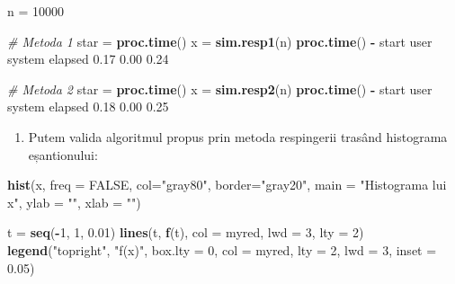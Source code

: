 \documentclass[]{article}
\newenvironment{Shaded}{\begin{snugshade}}{\end{snugshade}}
\newcommand{\KeywordTok}[1]{\textcolor[rgb]{0.13,0.29,0.53}{\textbf{#1}}}
\newcommand{\DataTypeTok}[1]{\textcolor[rgb]{0.13,0.29,0.53}{#1}}
\newcommand{\DecValTok}[1]{\textcolor[rgb]{0.00,0.00,0.81}{#1}}
\newcommand{\FloatTok}[1]{\textcolor[rgb]{0.00,0.00,0.81}{#1}}
\newcommand{\StringTok}[1]{\textcolor[rgb]{0.31,0.60,0.02}{#1}}
\newcommand{\CommentTok}[1]{\textcolor[rgb]{0.56,0.35,0.01}{\textit{#1}}}
\newcommand{\OtherTok}[1]{\textcolor[rgb]{0.56,0.35,0.01}{#1}}
\newcommand{\OperatorTok}[1]{\textcolor[rgb]{0.81,0.36,0.00}{\textbf{#1}}}
\newcommand{\NormalTok}[1]{#1}
\providecommand{\tightlist}{%
  \setlength{\itemsep}{0pt}\setlength{\parskip}{0pt}}
\begin{document}
\begin{Shaded}
\begin{Highlighting}[]
\NormalTok{n =}\StringTok{ }\DecValTok{10000}

\CommentTok{# Metoda 1}
\NormalTok{star =}\StringTok{ }\KeywordTok{proc.time}\NormalTok{()}
\NormalTok{x =}\StringTok{ }\KeywordTok{sim.resp1}\NormalTok{(n)}
\KeywordTok{proc.time}\NormalTok{() }\OperatorTok{-}\StringTok{ }\NormalTok{start}
\NormalTok{   user  system elapsed }
   \FloatTok{0.17}    \FloatTok{0.00}    \FloatTok{0.24} 

\CommentTok{# Metoda 2}
\NormalTok{star =}\StringTok{ }\KeywordTok{proc.time}\NormalTok{()}
\NormalTok{x =}\StringTok{ }\KeywordTok{sim.resp2}\NormalTok{(n)}
\KeywordTok{proc.time}\NormalTok{() }\OperatorTok{-}\StringTok{ }\NormalTok{start}
\NormalTok{   user  system elapsed }
   \FloatTok{0.18}    \FloatTok{0.00}    \FloatTok{0.25} 
\end{Highlighting}
\end{Shaded}

\begin{enumerate}
\def\labelenumi{\arabic{enumi}.}
\setcounter{enumi}{1}
\tightlist
\item
  Putem valida algoritmul propus prin metoda respingerii trasând
  histograma eșantionului:
\end{enumerate}

\begin{Shaded}
\begin{Highlighting}[]
\KeywordTok{hist}\NormalTok{(x, }\DataTypeTok{freq =} \OtherTok{FALSE}\NormalTok{, }
     \DataTypeTok{col=}\StringTok{"gray80"}\NormalTok{, }
     \DataTypeTok{border=}\StringTok{"gray20"}\NormalTok{,}
     \DataTypeTok{main =} \StringTok{"Histograma lui x"}\NormalTok{, }\DataTypeTok{ylab =} \StringTok{""}\NormalTok{, }
     \DataTypeTok{xlab =} \StringTok{""}\NormalTok{)}

\NormalTok{t =}\StringTok{ }\KeywordTok{seq}\NormalTok{(}\OperatorTok{-}\DecValTok{1}\NormalTok{, }\DecValTok{1}\NormalTok{, }\FloatTok{0.01}\NormalTok{)}
\KeywordTok{lines}\NormalTok{(t, }\KeywordTok{f}\NormalTok{(t), }
      \DataTypeTok{col =}\NormalTok{ myred, }\DataTypeTok{lwd =} \DecValTok{3}\NormalTok{, }\DataTypeTok{lty =} \DecValTok{2}\NormalTok{)}
\KeywordTok{legend}\NormalTok{(}\StringTok{"topright"}\NormalTok{, }
       \StringTok{"f(x)"}\NormalTok{, }
       \DataTypeTok{box.lty =} \DecValTok{0}\NormalTok{,}
       \DataTypeTok{col =}\NormalTok{ myred, }
       \DataTypeTok{lty =} \DecValTok{2}\NormalTok{, }\DataTypeTok{lwd =} \DecValTok{3}\NormalTok{, }\DataTypeTok{inset =} \FloatTok{0.05}\NormalTok{)}
\end{Highlighting}
\end{Shaded}
\end{document}
